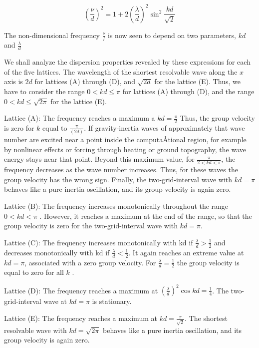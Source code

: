 {\[\left(\frac{\nu}{d}\right)^2 = 1 + 2\left(\frac{\lambda}{d}\right)^2 \sin^2{\frac{kd}{\sqrt{2}}}\]}

The non-dimensional frequency \(\frac{\nu}{f}\) is now seen to depend on
two parameters, \(kd\) and \(\frac{\lambda}{d}\)

We shall analyze the dispersion properties revealed by these expressions
for each of the five lattices. The wavelength of the shortest resolvable
wave along the \(x\) axis is \(2d\) for lattices (A) through (D), and
\(\sqrt{2d}\) for the lattice (E). Thus, we have to consider the range
\(0 < kd \leq \pi\) for lattices (A) through (D), and the range
\(0 < kd \leq \sqrt{2\pi}\) for the lattice (E).

Lattice (A): The frequency reaches a maximum a \( kd = \frac{\pi}{2}\)
Thus, the group velocity is zero for \(k\) equal to
\(\frac{\pi}{\left( 2d \right)}\). If gravity-inertia waves of
approximately that wave number are excited near a point inside the
computaÂ­tional region, for example by nonlinear effects or forcing
through heating or ground topography, the wave energy stays near that
point. Beyond this maximum value, for \(\frac{\pi}{2 < kd < \pi}\), the
frequency decreases as the wave number increases. Thus, for these waves
the group velocity has the wrong sign. Finally, the two-grid-interval
wave with \(kd = \pi\) behaves like a pure inertia oscillation, and its
group velocity is again zero.

Lattice (B): The frequency increases monotonically throughout the range
\(0 < kd < \pi\) . However, it reaches a maximum at the end of the
range, so that the group velocity is zero for the two-grid-interval wave
with \(kd = \pi.\)

Lattice (C): The frequency increases monotonically with \(\text{kd}\) if
\(\frac{\lambda}{d} > \frac{1}{2} \) and decreases monotonically with
\(\text{kd}\) if \(\frac{\lambda}{d} < \frac{1}{2}\). It again reaches
an extreme value at \(kd = \pi\), associated with a zero group velocity.
For \(\frac{\lambda}{d} = \frac{1}{2}\) the group velocity is equal to
zero for all \(k\) .

Lattice (D): The frequency reaches a maximum at
\(\left( \frac{\lambda}{d} \right)^{2}\cos{kd} = \frac{1}{4}\). The
two-grid-interval wave at \(kd = \pi\) is stationary.

Lattice (E): The frequency reaches a maximum at
\(kd = \frac{\pi}{\sqrt{2}}\). The shortest resolvable wave with
\(kd = \sqrt{2\pi}\) behaves like a pure inertia oscillation, and its
group velocity is again zero.

